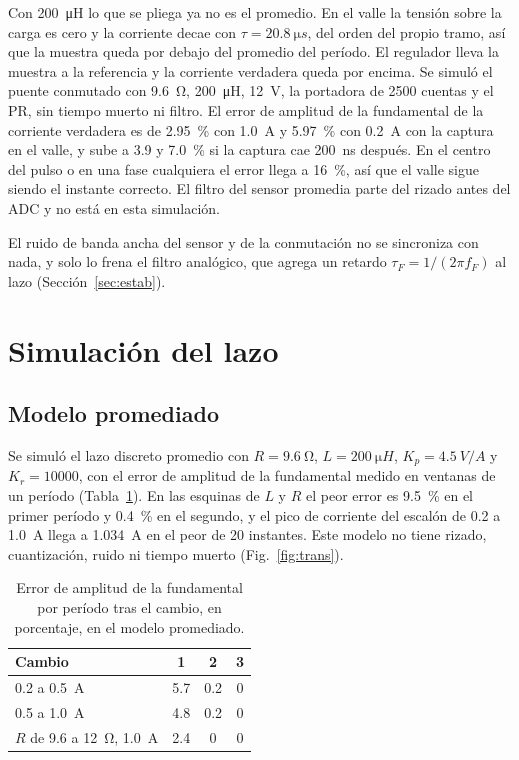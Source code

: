 \documentclass[journal]{IEEEtran}
\begin{document}
Con \SI{200}{\micro H} lo que se pliega ya no es el promedio. En el valle la tensión sobre la carga es cero y la corriente decae con $\tau=\SI{20.8}{\micro s}$, del orden del propio tramo, así que la muestra queda por debajo del promedio del período. El regulador lleva la muestra a la referencia y la corriente verdadera queda por encima. Se simuló el puente conmutado con \SI{9.6}{\ohm}, \SI{200}{\micro H}, \SI{12}{V}, la portadora de \num{2500} cuentas y el PR, sin tiempo muerto ni filtro. El error de amplitud de la fundamental de la corriente verdadera es de \SI{2.95}{\percent} con \SI{1.0}{A} y \SI{5.97}{\percent} con \SI{0.2}{A} con la captura en el valle, y sube a \num{3.9} y \SI{7.0}{\percent} si la captura cae \SI{200}{ns} después. En el centro del pulso o en una fase cualquiera el error llega a \SI{16}{\percent}, así que el valle sigue siendo el instante correcto. El filtro del sensor promedia parte del rizado antes del ADC y no está en esta simulación.

El ruido de banda ancha del sensor y de la conmutación no se sincroniza con nada, y solo lo frena el filtro analógico, que agrega un retardo $\tau_F=1/(2\pi f_F)$ al lazo (Sección~\ref{sec:estab}).

\section{Simulación del lazo}
\label{sec:sim}

\subsection{Modelo promediado}
Se simuló el lazo discreto promedio con $R=\SI{9.6}{\ohm}$, $L=\SI{200}{\micro H}$, $K_p=\SI{4.5}{V/A}$ y $K_r=\num{10000}$, con el error de amplitud de la fundamental medido en ventanas de un período (Tabla~\ref{tab:err_sim}). En las esquinas de $L$ y $R$ el peor error es \SI{9.5}{\percent} en el primer período y \SI{0.4}{\percent} en el segundo, y el pico de corriente del escalón de \num{0.2} a \SI{1.0}{A} llega a \SI{1.034}{A} en el peor de \num{20} instantes. Este modelo no tiene rizado, cuantización, ruido ni tiempo muerto (Fig.~\ref{fig:trans}).

\begin{table}[!ht]
	\centering
	\caption{Error de amplitud de la fundamental por período tras el cambio, en porcentaje, en el modelo promediado.}
	\label{tab:err_sim}
	\begin{tabular}{lccc}
		\toprule
		Cambio & 1 & 2 & 3 \\
		\midrule
		\num{0.2} a \SI{0.5}{A} & \num{5.7} & \num{0.2} & \num{0} \\
		\num{0.5} a \SI{1.0}{A} & \num{4.8} & \num{0.2} & \num{0} \\
		$R$ de \num{9.6} a \SI{12}{\ohm}, \SI{1.0}{A} & \num{2.4} & \num{0} & \num{0} \\
		\bottomrule
	\end{tabular}
\end{table}
\end{document}
